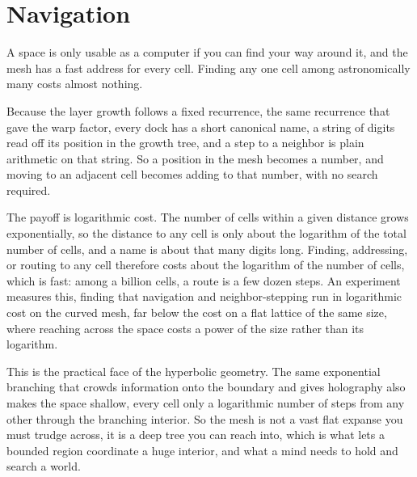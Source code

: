 \section{Navigation}

A space is only usable as a computer if you can find your way around it, and the mesh has a fast address for every
cell. Finding any one cell among astronomically many costs almost nothing.

Because the layer growth follows a fixed recurrence, the same recurrence that gave the warp factor, every dock has a
short canonical name, a string of digits read off its position in the growth tree, and a step to a neighbor is plain
arithmetic on that string. So a position in the mesh becomes a number, and moving to an adjacent cell becomes adding
to that number, with no search required.

The payoff is logarithmic cost. The number of cells within a given distance grows exponentially, so the distance to any
cell is only about the logarithm of the total number of cells, and a name is about that many digits long. Finding,
addressing, or routing to any cell therefore costs about the logarithm of the number of cells, which is fast: among a
billion cells, a route is a few dozen steps. An experiment measures this, finding that navigation and neighbor-stepping
run in logarithmic cost on the curved mesh, far below the cost on a flat lattice of the same size, where reaching
across the space costs a power of the size rather than its logarithm.

This is the practical face of the hyperbolic geometry. The same exponential branching that crowds information onto the
boundary and gives holography also makes the space shallow, every cell only a logarithmic number of steps from any other
through the branching interior. So the mesh is not a vast flat expanse you must trudge across, it is a deep tree you
can reach into, which is what lets a bounded region coordinate a huge interior, and what a mind needs to hold and search
a world.
